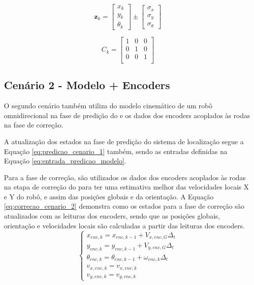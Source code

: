 \documentclass[acronym, symbols, table]{fei}
\begin{document}
	 		\begin{equation}\label{eq:correcao_cenario_1}
			 	\textbf{z}_k  = 
			 	\begin{bmatrix}
			 		x_k \\
			 		y_k \\
			 		\theta_k
			 	\end{bmatrix} \pm
			 	\begin{bmatrix}
			 		\sigma_x \\
			 		\sigma_y \\
			 		\sigma_{\theta}
			 	\end{bmatrix}
			 \end{equation}
			 
			\begin{equation}\label{eq:matriz_C_cenario_1}
			 	C_{k} = \begin{bmatrix}
			 		1 & 0 & 0 \\
			 		0 & 1 & 0 \\
			 		0 & 0 & 1 \\
			 	\end{bmatrix}
		 	\end{equation}
		
		\subsection{Cenário 2 - Modelo + Encoders} \label{sec:implementacao_cenario_2}
		
			O segundo cenário também utiliza do modelo cinemático de um robô omnidirecional na fase de predição do  e os dados dos encoders acoplados às rodas na fase de correção.
			
			A atualização dos estados na fase de predição do sistema de localização segue a Equação \ref{eq:predicao_cenario_1} também, sendo as entradas definidas na Equação \ref{eq:entrada_predicao_modelo}.
			
			Para a fase de correção, são utilizados os dados dos encoders acoplados às rodas na etapa de correção do  para ter uma estimativa melhor das velocidades locais X e Y do robô, e assim das posições globais e da orientação. A Equação \ref{eq:correcao_cenario_2} demonstra como os estados para a fase de correção são atualizados com as leituras dos encoders, sendo que as posições globais, orientação e velocidades locais são calculadas a partir das leituras dos encoders. 
			\begin{equation}\label{eq:correcao_cenario_2}
				\begin{cases}
					x_{enc,k} = x_{enc,k-1} + V_{x,enc,G} \Delta_t \\
					y_{enc,k} = y_{enc,k-1} + V_{y,enc,G} \Delta_t  \\
					\theta_{enc,k} = \theta_{enc,k-1} + \omega_{enc,k} \Delta_t \\
					v_{x,enc,k} = v_{x,enc,k}\\
					v_{y,enc,k} = v_{y,enc,k}
				\end{cases}
			\end{equation}
			
\end{document}
